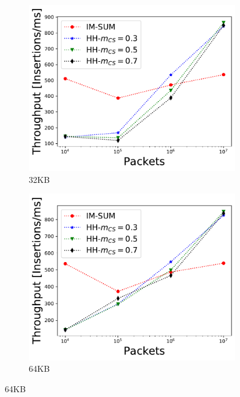\begin{figure}

\begin{subfigure}[t]{0.32\textwidth}
    \includegraphics[width=\linewidth]{HH/figures/throughput_per_pkts_m=0.03125.pdf}
    \caption{32KB}
    \label{fig:fig4_a}    
\end{subfigure}\hfill
\begin{subfigure}[t]{0.32\textwidth}
    \includegraphics[width=\linewidth]{HH/figures/throughput_per_pkts_m=0.0625.pdf}
    \caption{64KB}
    \label{fig:fig4_b}
\end{subfigure}\hfill

\end{figure}
